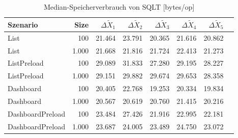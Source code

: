 
\begin{table}[ht]
\setlength{\extrarowheight}{-1pt}
\centering
\caption{Median-Speicherverbrauch von SQLT [bytes/op]}
\begin{tabular}{lrrrrrrr}
\toprule
Szenario & Size & ${\Delta \tilde{X}_1}$ & ${\Delta \tilde{X}_2}$ & ${\Delta \tilde{X}_3}$ & ${\Delta \tilde{X}_4}$ & ${\Delta \tilde{X}_5}$ \\
\midrule
	List & 100 & \cellcolor{red!50}  21.464 & \cellcolor{red!50}  23.791 & \cellcolor{red!50}  20.365 & \cellcolor{red!50}  21.616 & \cellcolor{red!50}  20.862 \\
	List & 1.000 & \cellcolor{red!50}  21.668 & \cellcolor{red!50}  21.816 & \cellcolor{red!50}  21.724 & \cellcolor{red!50}  22.413 & \cellcolor{red!50}  21.273 \\
	ListPreload & 100 & \cellcolor{red!50}  29.089 & \cellcolor{red!50}  31.833 & \cellcolor{red!50}  27.280 & \cellcolor{red!50}  29.195 & \cellcolor{red!50}  28.227 \\
	ListPreload & 1.000 & \cellcolor{red!50}  29.151 & \cellcolor{red!50}  29.882 & \cellcolor{red!50}  29.674 & \cellcolor{red!50}  29.653 & \cellcolor{red!50}  28.358 \\
	Dashboard & 100 & \cellcolor{red!50}  20.405 & \cellcolor{red!46}  22.768 & \cellcolor{red!49}  19.253 & \cellcolor{red!50}  20.334 & \cellcolor{red!49}  19.834 \\
	Dashboard & 1.000 & \cellcolor{red!47}  20.567 & \cellcolor{red!47}  20.619 & \cellcolor{red!50}  20.760 & \cellcolor{red!50}  21.415 & \cellcolor{red!50}  20.216 \\
	DashboardPreload & 100 & \cellcolor{red!50}  23.484 & \cellcolor{red!50}  27.426 & \cellcolor{red!44}  21.916 & \cellcolor{red!50}  22.995 & \cellcolor{red!43}  22.181 \\
	DashboardPreload & 1.000 & \cellcolor{red!45}  23.687 & \cellcolor{red!48}  24.005 & \cellcolor{red!48}  23.489 & \cellcolor{red!50}  24.750 & \cellcolor{red!49}  23.072 \\
\bottomrule
\end{tabular}
\label{tab:speicherverbrauch_sqlt}
\end{table}
	